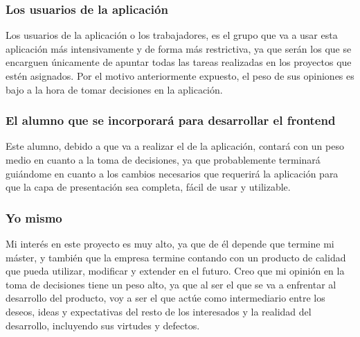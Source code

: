 \subsubsection{Los usuarios de la aplicación}
Los usuarios de la aplicación o los trabajadores, es el grupo que va a usar esta aplicación más intensivamente y
de forma más restrictiva, ya que serán los que se encarguen únicamente de apuntar
todas las tareas realizadas en los proyectos que estén asignados. Por el motivo
anteriormente expuesto, el peso de sus opiniones es bajo a la hora de tomar
decisiones en la aplicación.

\subsubsection{El alumno que se incorporará para desarrollar el frontend}
Este alumno, debido a que va a realizar el  de la aplicación,
contará con un peso medio en cuanto a la toma de decisiones, ya que probablemente
terminará guiándome en cuanto a los cambios necesarios que requerirá la aplicación
para que la capa de presentación sea completa, fácil de usar y utilizable.

\subsubsection{Yo mismo}
Mi interés en este proyecto es muy alto, ya que de él depende que termine
mi máster, y también que la empresa termine contando con un producto de
calidad que pueda utilizar, modificar y extender en el futuro. Creo que mi
opinión en la toma de decisiones tiene un peso alto, ya que al ser el que
se va a enfrentar al desarrollo del producto, voy a ser el que actúe como
intermediario entre los deseos, ideas y expectativas del resto de los interesados
y la realidad del desarrollo, incluyendo sus virtudes y defectos.
